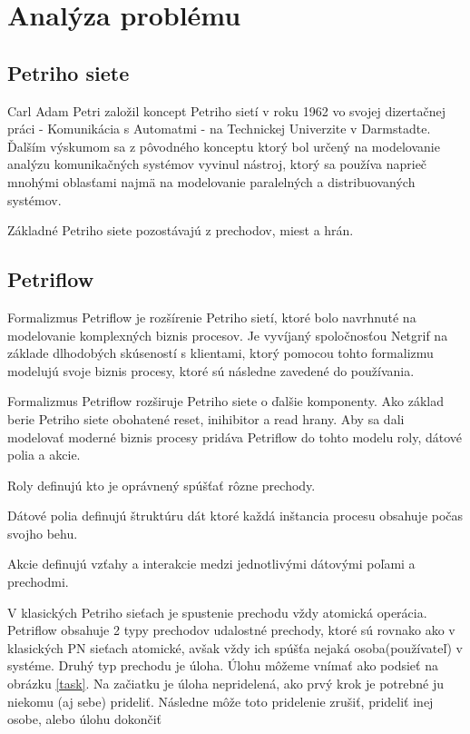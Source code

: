 
\section{Analýza problému}  

\subsection{Petriho siete} %
Carl Adam Petri založil koncept Petriho sietí v roku 1962 vo svojej dizertačnej práci - Komunikácia s Automatmi - na Technickej Univerzite v Darmstadte. Ďalším výskumom sa z pôvodného konceptu ktorý bol určený na modelovanie analýzu komunikačných systémov vyvinul nástroj, ktorý sa používa naprieč mnohými oblasťami najmä na modelovanie paralelných a distribuovaných systémov.  

Základné Petriho siete pozostávajú z prechodov, miest a hrán.  


\subsection{Petriflow} %

\cite{petriflow_clanok} 

Formalizmus Petriflow je rozšírenie Petriho sietí, ktoré bolo navrhnuté na modelovanie komplexných biznis procesov. Je vyvíjaný spoločnosťou Netgrif na základe dlhodobých skúseností s klientami, ktorý pomocou tohto formalizmu modelujú svoje biznis procesy, ktoré sú následne zavedené do používania.  




Formalizmus Petriflow rozširuje Petriho siete o ďalšie komponenty. Ako základ berie Petriho siete obohatené reset, inihibitor a read hrany. Aby sa dali modelovať moderné biznis procesy pridáva Petriflow do tohto modelu roly, dátové polia a akcie.  

Roly definujú kto je oprávnený spúšťať rôzne prechody.  

Dátové polia definujú štruktúru dát ktoré každá inštancia procesu obsahuje počas svojho behu. 

Akcie definujú vzťahy a interakcie medzi jednotlivými dátovými poľami a prechodmi. 

V klasických Petriho sieťach je spustenie prechodu vždy atomická operácia. Petriflow obsahuje 2 typy prechodov udalostné prechody, ktoré sú rovnako  ako v klasických PN sieťach atomické, avšak vždy ich spúšťa nejaká osoba(používateľ) v systéme. Druhý typ prechodu je úloha. Úlohu môžeme vnímať ako podsieť na obrázku \ref{task}. Na začiatku je úloha nepridelená, ako prvý krok je potrebné ju niekomu (aj sebe) prideliť. Následne môže toto pridelenie zrušiť, prideliť inej osobe, alebo úlohu dokončiť 


